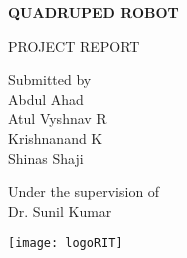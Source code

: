 \begin{center}
\vspace{4cm}

{\Huge\textbf{QUADRUPED ROBOT}}\\
\vspace{2cm}

\Large PROJECT REPORT\\
\vspace{1.75cm}

Submitted by\\
\vspace{0.5cm}
\large Abdul Ahad\\
\large Atul Vyshnav R\\
\large Krishnanand K\\ 
\large Shinas Shaji\\
\vspace{1.5cm}

Under the supervision of\\
\large Dr. Sunil Kumar\\
\vspace{1.5cm}

\texttt{[image: logoRIT]}

\vspace*{\fill}
\end{center}

\begin{center}
    
\end{center}